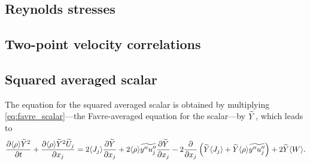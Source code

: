 \documentclass[oneside,a4paper,11pt]{report}
\begin{document}
\subsection{Reynolds stresses}

\subsection{Two-point velocity correlations}

\subsection{Squared averaged scalar}
The equation for the squared averaged scalar is obtained by multiplying \cref{eq:favre_scalar}---the Favre-averaged equation for the scalar---by $\widetilde{Y}$, which leads to
\begin{equation}
    \label{eq:squared_averaged_scalar_favre}
    \frac{\partial \langle \rho \rangle \widetilde{Y}^2}{\partial t} + \frac{\partial \langle \rho \rangle \widetilde{Y}^2 \widetilde{U}_j}{\partial x_j} = 2 \langle J_j \rangle \frac{\partial \widetilde{Y}}{\partial x_j} + 2 \langle \rho \rangle \widetilde{y'' u_j''} \frac{\partial \widetilde{Y}}{\partial x_j} - 2\frac{\partial}{\partial x_j} \left ( \widetilde{Y} \langle J_j \rangle + \widetilde{Y} \langle \rho \rangle \widetilde{y'' u_j''} \right ) + 2 \widetilde{Y} \langle W \rangle.
\end{equation}

\end{document}
